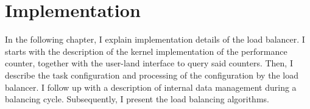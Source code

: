 \chapter{Implementation}
\label{sec:implementation}


In the following chapter, I explain implementation details of the load balancer.
I starts with the description of the kernel implementation of the performance
counter, together with the user-land interface to query said counters.
Then, I describe the task configuration and processing of the configuration by
the load balancer.
I follow up with a description of internal data management during a balancing cycle.
Subsequently, I present the load balancing algorithms.







\cleardoublepage


